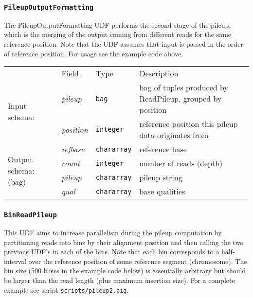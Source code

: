\subsubsection{\texttt{PileupOutputFormatting}}

The PileupOutputFormatting UDF performs the second stage of the
pileup, which is the merging of the output coming from different reads
for the same reference position. Note that the UDF assumes that input
is passed in the order of reference position. For usage see the
example code above.

\begin{tabular}{lp{}p{}p{}}
& Field & Type & Description\\[0.1cm]
\multirow{2}{*}{Input schema:} & \emph{pileup} & \texttt{bag} & bag of tuples produced by ReadPileup, grouped by position\\
& \emph{position} & \texttt{integer} & reference position this pileup data originates from\\\hline
\multirow{4}{*}{\parbox{2.2cm}{Output schema: (bag)}} & \emph{refbase} & \texttt{chararray} & reference base\\
& \emph{count} & \texttt{integer} & number of reads (depth)\\
& \emph{pileup} & \texttt{chararray} & pileup string\\
& \emph{qual} & \texttt{chararray} & base qualities
\end{tabular}

\subsubsection{\texttt{BinReadPileup}}

This UDF aims to increase parallelism during the pileup computation by
partitioning reads into bins by their alignment position and then
calling the two previous UDF's in each of the bins. Note that each bin
corresponds to a half-interval over the reference position of some
reference segment (chromosome). The bin size (500 bases in the example
code below) is essentially arbitrary but should be larger than the
read length (plus maximum insertion size). For a complete example see
script \texttt{scripts/pileup2.pig}.

